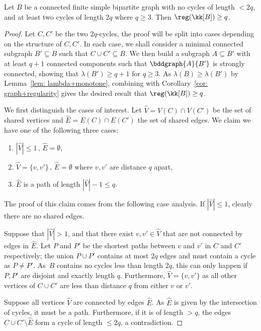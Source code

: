 \begin{lemma}\label{lem: twocycles}
Let $B$ be a connected finite simple bipartite graph with no cycles of length $<2q$, and at least two cycles of length $2q$ where $q \geq 3$.
Then $\reg(\kk[B]) \geq q$.
\end{lemma}
\begin{proof}
Let $C, C'$ be the two $2q$-cycles, the proof will be split into cases depending on the structure of $C,C'$.
In each case, we shall consider a minimal connected subgraph $B' \subseteq B$ such that $C \cup C' \subseteq B$.
We then build a subgraph $A \subseteq B'$ with at least $q+1$ connected components such that $\bddgraph{A}{B'}$ is strongly connected, showing that $\lambda (B') \geq q+1$ for $q \geq 3$.
As $\lambda(B) \geq \lambda(B')$ by Lemma~\ref{lem: lambda+monotone}, combining with Corollary~\ref{cor: graph+regularity} gives the desired result that $\reg(\kk[B]) \geq q$.

We first distinguish the cases of interest.
Let $\widehat{V} = V(C) \cap V(C')$ be the set of shared vertices and $\widehat{E} = E(C) \cap E(C')$ the set of shared edges.
We claim we have one of the following three cases:
\begin{enumerate}
    \item $|\widehat{V}| \leq 1\, , \,  \widehat{E} = \emptyset$,
    \item $\widehat{V} = \{v, v'\} \, , \, \widehat{E} = \emptyset$ where $v, v'$ are distance $q$ apart,
    \item $\widehat{E}$ is a path of length $|\widehat{V}| - 1 \leq q$.
\end{enumerate}

The proof of this claim comes from the following case analysis.
If $|\widehat{V}| \leq 1$, clearly there are no shared edges.

Suppose that $|\widehat{V}| > 1$, and that there exist $v, v' \in \widehat{V}$ that are not connected by edges in $\widehat{E}$.
Let $P$ and $P'$ be the shortest paths between $v$ and $v'$ in $C$ and $C'$ respectively; the union $P \cup P'$ contains at most $2q$ edges and must contain a cycle as $P \neq P'$.
As~$B$ contains no cycles less than length $2q$, this can only happen if $P, P'$ are disjoint and exactly length $q$.
Furthermore, $\widehat{V} = \{v, v'\}$ as all other vertices of $C \cup C'$ are less than distance $q$ from either $v$ or $v'$.

Suppose all vertices $\widehat{V}$ are connected by edges $\widehat{E}$.
As $\widehat{E}$ is given by the intersection of cycles, it must be a path.
Furthermore, if it is of length $> q$, the edges $C \cup C' \setminus \widehat{E}$ form a cycle of length $\leq 2q$, a contradiction.


\end{proof}

